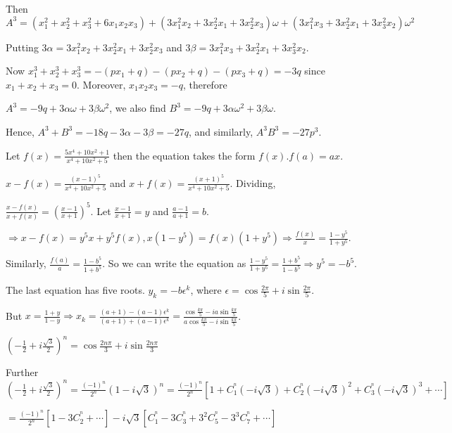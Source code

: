   Then $A^3 = (x_1^2 + x_2^2 + x_3^2 + 6x_1x_2x_3) + (3x_1^2x_2 + 3x_2^2x_1 + 3x_2^2x_3)\omega + (3x_1^2x_3
  + 3x_2^2x_1 + 3x_3^2x_2)\omega^2$

  Putting $3\alpha = 3x_1^2x_2 + 3x_2^2x_1 + 3x_2^2x_3$ and $3\beta = 3x_1^2x_3 + 3x_2^2x_1 + 3x_3^2x_2$.

  Now $x_1^3 + x_2^3 + x_3^3 = -(px_1 + q) - (px_2 + q) - (px_3 + q) = -3q$ since $x_1 + x_2 + x_3 =
  0$. Moreover, $x_1x_2x_3 = -q$, therefore

  $A^3 = -9q + 3\alpha\omega + 3\beta\omega^2$, we also find $B^3 = -9q + 3\alpha\omega^2 + 3\beta\omega$.

  Hence, $A^3 + B^3 = -18q - 3\alpha - 3\beta = -27q$, and similarly, $A^3B^3 = -27p^3$.
\item Let $f(x) = \frac{5x^4 + 10x^2 + 1}{x^4 + 10x^2 + 5}$ then the equation takes the form $f(x).f(a) =
  ax$.

  $x - f(x) = \frac{(x - 1)^5}{x^4 + 10x^2 + 5}$ and $x + f(x) = \frac{(x + 1)^5}{x^4 + 10x^2 +
    5}$. Dividing,

  $\frac{x - f(x)}{x + f(x)} = \left(\frac{x - 1}{x + 1}\right)^5$. Let $\frac{x - 1}{x + 1} = y$ and
  $\frac{a - 1}{a + 1} = b$.

  $\Rightarrow x - f(x) = y^5x + y^5f(x), x(1 - y^5) = f(x)(1 + y^5)\Rightarrow \frac{f(x)}{x} = \frac{1 -
    y^5}{1 + y^5}$.

  Similarly, $\frac{f(a)}{a} = \frac{1 - b^5}{1 + b^5}$. So we can write the equation as $\frac{1 - y^5}{1 +
    y^5} = \frac{1 + b^5}{1 - b^5}\Rightarrow y^5 = -b^5$.

  The last equation has five roots. $y_k = -b\epsilon^k$, where $\epsilon = \cos\frac{2\pi}{5} +
  i\sin\frac{2\pi}{5}$.

  But $x = \frac{1 + y}{1 - y}\Rightarrow x_k = \frac{(a + 1) - (a - 1)\epsilon^k}{(a + 1) + (a -
    1)\epsilon^k} = \frac{\cos\frac{k\pi}{5} - ia\sin\frac{k\pi}{5}}{a\cos\frac{k\pi}{5} -
    i\sin\frac{k\pi}{5}}$.
\item $\left(-\frac{1}{2} + i\frac{\sqrt{3}}{2}\right)^n = \cos\frac{2n\pi}{3} + i\sin\frac{2n\pi}{3}$

  Further $\left(-\frac{1}{2} + i\frac{\sqrt{3}}{2}\right)^n = \frac{(-1)^n}{2^n}(1 - i\sqrt{3})^n =
  \frac{(-1)^n}{2^n}[1 + C_1^^n(-i\sqrt{3}) + C_2^^n(-i\sqrt{3})^2 + C_3^^n(-i\sqrt{3})^3 + \cdots]$

  $= \frac{(-1)^n}{2^n}[1 - 3C_2^^n + \cdots] -i\sqrt{3}[C_1^^n -3C_3^^n + 3^2C_5^^n - 3^3C_7^^n + \cdots]$

